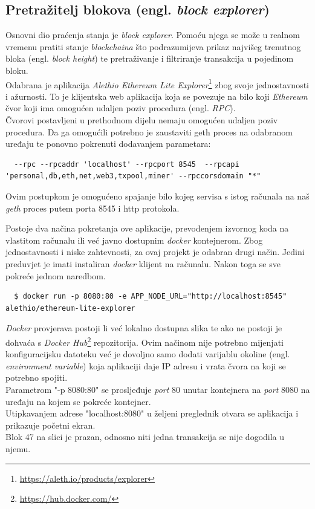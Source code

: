 \documentclass[times, utf8, zavrsni, numeric]{fer}
\begin{document}
\subsection{Pretražitelj blokova (engl. \emph{block explorer})}
Osnovni dio praćenja stanja je \emph{block explorer}. Pomoću njega se može u realnom vremenu pratiti stanje \emph{blockchaina}
što podrazumijeva prikaz najvišeg trenutnog bloka (engl. \emph{block height}) te pretraživanje i filtriranje transakcija u 
pojedinom bloku. \\
Odabrana je aplikacija \emph{Alethio Ethereum Lite Explorer}\footnote{\url{https://aleth.io/products/explorer}} zbog svoje jednostavnosti i ažurnosti. To je klijentska
web aplikacija koja se povezuje na bilo koji \emph{Ethereum} čvor koji ima omogućen udaljen poziv procedura (engl. \emph{RPC}).\citep{explorer} \\
Čvorovi postavljeni u prethodnom dijelu nemaju omogućen udaljen poziv procedura. Da ga omogućili potrebno je zaustaviti geth proces
na odabranom uređaju te ponovno pokrenuti dodavanjem parametara:

\begin{lstlisting}
  --rpc --rpcaddr 'localhost' --rpcport 8545  --rpcapi 'personal,db,eth,net,web3,txpool,miner' --rpccorsdomain "*"
\end{lstlisting}

Ovim postupkom je omogućeno spajanje bilo kojeg servisa s istog računala na naš \emph{geth} proces putem porta 8545 i http protokola.

Postoje dva načina pokretanja ove aplikacije, prevođenjem izvornog koda na vlastitom računalu ili već javno dostupnim
\emph{docker} kontejnerom. Zbog jednostavnosti i niske zahtevnosti, za ovaj projekt je odabran drugi način.
Jedini preduvjet je imati instaliran \emph{docker} klijent na računalu. Nakon toga se sve pokreće jednom naredbom.

\begin{lstlisting}
  $ docker run -p 8080:80 -e APP_NODE_URL="http://localhost:8545" alethio/ethereum-lite-explorer
\end{lstlisting}

\emph{Docker} provjerava postoji li već lokalno dostupna slika te ako ne postoji je dohvaća s \emph{Docker Hub}\footnote{\url{https://hub.docker.com/}} repozitorija.
Ovim načinom nije potrebno mijenjati konfiguracijsku datoteku već je dovoljno samo dodati varijablu okoline (engl. \emph{environment variable})
koja aplikaciji daje IP adresu i vrata čvora na koji se potrebno spojiti. \\
Parametrom "-p 8080:80" se prosljeđuje \emph{port} 80 unutar kontejnera na \emph{port} 8080 na uređaju na kojem se pokreće kontejner. \\
Utipkavanjem adrese "localhost:8080" u željeni preglednik otvara se aplikacija i prikazuje početni ekran. \\
Blok 47 na slici je prazan, odnosno niti jedna transakcija se nije dogodila u njemu.
\end{document}
